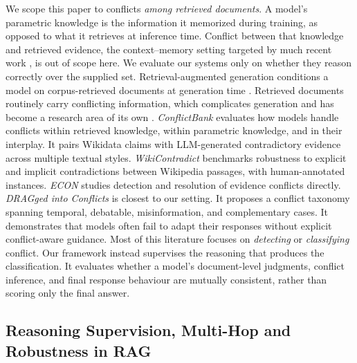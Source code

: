 \documentclass{article} %
\begin{document}
We scope this paper to conflicts \emph{among retrieved documents}. A model's
parametric knowledge is the information it memorized during training, as
opposed to what it retrieves at inference time. Conflict between that
knowledge and retrieved evidence, the context--memory setting targeted by much
recent work \citep{huo2025microact,zhang2025faithfulrag,ye2026seeingthrough},
is out of scope here. We evaluate our systems only on whether they reason
correctly over the supplied set. Retrieval-augmented generation conditions a model on corpus-retrieved documents at
generation time
\citep{guu2020realm,lewis2020rag,izacard2023atlas,borgeaud2022,gao2024retrievalaugmentedgenerationlargelanguage,ram-etal-2023-context}.
Retrieved documents routinely carry conflicting information, which complicates
generation and has become a research area of its own
\citep{xu2024knowledgeconflictsllmssurvey}. \textit{ConflictBank} \citep{su2024conflictbankbenchmarkevaluatinginfluence} evaluates how models handle conflicts within retrieved knowledge, within parametric knowledge, and in their interplay. It pairs Wikidata claims with LLM-generated contradictory evidence across multiple textual styles. \textit{WikiContradict} \citep{hou2024wikicontradict} benchmarks robustness to explicit and implicit contradictions between Wikipedia passages, with human-annotated instances. \textit{ECON} \citep{jiayang2024econ} studies detection and resolution of evidence conflicts directly.
\textit{DRAGged into Conflicts} \citep{cattan2025dragged} is closest to our
setting. It proposes a conflict taxonomy spanning temporal, debatable,
misinformation, and complementary cases. It demonstrates that models often fail
to adapt their responses without explicit conflict-aware guidance. Most of this
literature focuses on \emph{detecting} or \emph{classifying} conflict.
Our framework instead supervises the reasoning that produces the
classification. It evaluates whether a model's document-level judgments,
conflict inference, and final response behaviour are mutually consistent,
rather than scoring only the final answer.

\subsection{Reasoning Supervision, Multi-Hop and Robustness in RAG}
\end{document}
